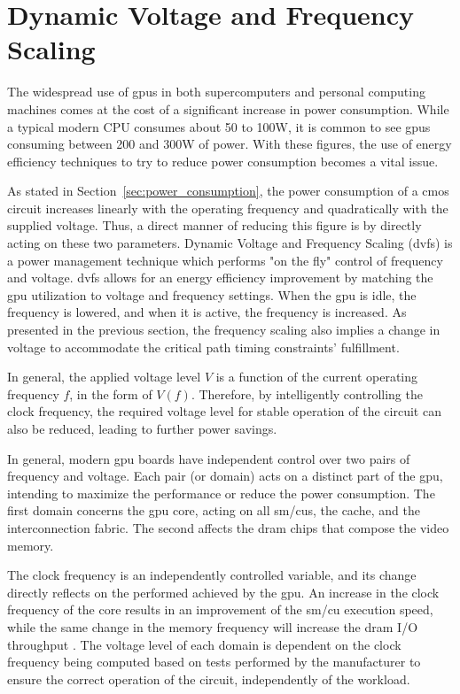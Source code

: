 \section{Dynamic Voltage and Frequency Scaling}
\label{section:DVFS}

The widespread use of \acrshort{gpu}s in both supercomputers and personal computing machines comes at the cost of a significant increase in power consumption. While a typical modern CPU consumes about 50 to 100W, it is common to see \acrshort{gpu}s consuming between 200 and 300W of power. With these figures, the use of energy efficiency techniques to try to reduce power consumption becomes a vital issue.

As stated in Section~\ref{sec:power_consumption}, the power consumption of a \acrshort{cmos} circuit increases linearly with the operating frequency and quadratically with the supplied voltage. Thus, a direct manner of reducing this figure is by directly acting on these two parameters. 
Dynamic Voltage and Frequency Scaling (\acrshort{dvfs}) is a power management technique which performs "on the fly" control of frequency and voltage. \acrshort{dvfs} allows for an energy efficiency improvement by matching the \acrshort{gpu} utilization to voltage and frequency settings. When the \acrshort{gpu} is idle, the frequency is lowered, and when it is active, the frequency is increased. As presented in the previous section, the frequency scaling also implies a change in voltage to accommodate the critical path timing constraints' fulfillment. 

In general, the applied voltage level $V$ is a function of the current operating frequency $f$, in the form of $V(f)$. Therefore, by intelligently controlling the clock frequency, the required voltage level for stable operation of the circuit can also be reduced, leading to further power savings.

In general, modern \acrshort{gpu} boards have independent control over two pairs of frequency and voltage. Each pair (or domain) acts on a distinct part of the \acrshort{gpu}, intending to maximize the performance or reduce the power consumption. The first domain concerns the \acrshort{gpu} core, acting on all \acrshort{sm}/\acrshort{cu}s, the cache, and the interconnection fabric. The second affects the \acrshort{dram} chips that compose the video memory. 

The clock frequency is an independently controlled variable, and its change directly reflects on the performed achieved by the \acrshort{gpu}. An increase in the clock frequency of the core results in an improvement of the \acrshort{sm}/\acrshort{cu} execution speed, while the same change in the memory frequency will increase the \acrshort{dram} I/O throughput \cite{mei_survey_2016}. The voltage level of each domain is dependent on the clock frequency being computed based on tests performed by the manufacturer to ensure the correct operation of the circuit, independently of the workload.

